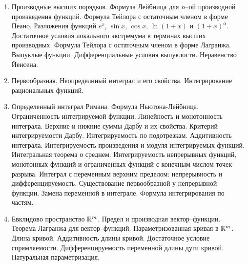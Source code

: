 \begin{enumerate}
    \item Производные высших порядков. Формула Лейбница для $n$--ой производной произведения функций. Формула Тейлора с остаточным членом в форме Пеано. Разложения функций $e^{x}$, $\sin x$, $\cos x$, $\ln(1+x)$ и $(1+x)^{\alpha}$. Достаточное условия локального экстремума в терминах высших производных. Формула Тейлора с остаточным членом в форме Лагранжа. Выпуклые функции. Дифференциальные условия выпуклости. Неравенство Йенсена.
    \item Первообразная. Неопределнный интеграл и его свойства. Интегрирование рациональных функций.
    \item Определенный интеграл Римана. Формула Ньютона-Лейбница. Ограниченность интегрируемой функции. Линейность и монотонность интеграла. Верхние и нижние суммы Дарбу и их свойства. Критерий интегрируемости Дарбу. Интегрируемость по подотрезкам. Аддитивность интеграла. Интегрируемость произведения и модуля интегрируемых функций. Интегральная теорема о среднем. Интегрируемость непрерывных функций, монотонных функций и ограниченных функций с конечным числом точек разрыва. Интеграл с переменным верхним пределом: непрерывность и дифференцируемость. Существование первообразной у непрерывной функции. Замена переменной в интеграле. Формула интегрирования по частям.
    \item Евклидово пространство $\mathbb{R}^{m}$. Предел и производная вектор--функции. Теорема Лагранжа для вектор--функций. Параметризованная кривая в $\mathbb{R}^{m}$. Длина кривой. Аддитивность длины кривой. Достаточное условие спрямляемости. Дифференцируемость переменной длины дуги кривой. Натуральная параметризация.
\end{enumerate}